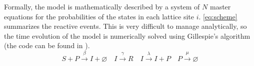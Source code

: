 \begin{table}[H]
    \centering
    \caption[Variables and parameters of the individual-based SIRP
        model]{Variables and parameters of the individual-based SIRP model.}
    \label{tab:IBM_params}
\end{table}

Formally, the model is mathematically described by a system of $N$ master
equations for the probabilities of the states in each lattice site $i$.
\cref{eq:scheme} summarizes the reactive events. This is
very difficult to manage analytically, so the time evolution of the model is
numerically solved using Gillespie's algorithm \cite{Gillespie1977} (the code
can be found in \cite{CODE_nacras}).
\begin{equation}\label{eq:scheme}
    S+P \stackrel{\beta}{\rightarrow} I + \varnothing \quad I
    \stackrel{\gamma}{\rightarrow} R \quad I \stackrel{\lambda}{\rightarrow}
    I+P
    \quad P \stackrel{\mu}{\rightarrow} \varnothing
\end{equation}

